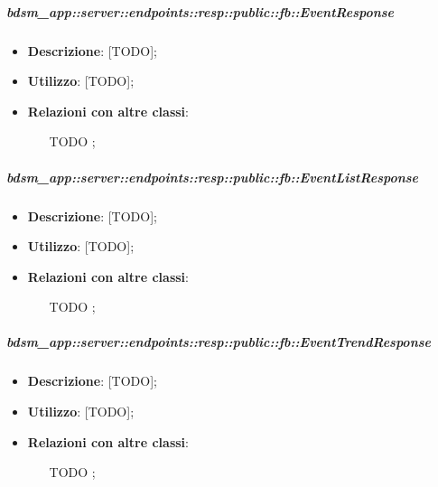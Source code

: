     \subparagraph{bdsm\_app::server::endpoints::resp::public::fb::EventResponse} %
    \label{subp:bdsm_app_server_endpoints_resp_public_fb_eventresponse}
    \begin{itemize}
      \item \textbf{Descrizione}: [TODO];
      \item \textbf{Utilizzo}: [TODO];
      \item \textbf{Relazioni con altre classi}:
        \begin{itemize}
          \item [TODO];
        \end{itemize}
      \end{itemize}
    
    \subparagraph{bdsm\_app::server::endpoints::resp::public::fb::EventListResponse} %
    \label{subp:bdsm_app_server_endpoints_resp_public_fb_eventlistresponse}
    \begin{itemize}
      \item \textbf{Descrizione}: [TODO];
      \item \textbf{Utilizzo}: [TODO];
      \item \textbf{Relazioni con altre classi}:
        \begin{itemize}
          \item [TODO];
        \end{itemize}
      \end{itemize}
    
    \subparagraph{bdsm\_app::server::endpoints::resp::public::fb::EventTrendResponse} %
    \label{subp:bdsm_app_server_endpoints_resp_public_fb_eventtrendresponse}
    \begin{itemize}
      \item \textbf{Descrizione}: [TODO];
      \item \textbf{Utilizzo}: [TODO];
      \item \textbf{Relazioni con altre classi}:
        \begin{itemize}
          \item [TODO];
        \end{itemize}
      \end{itemize}
    
